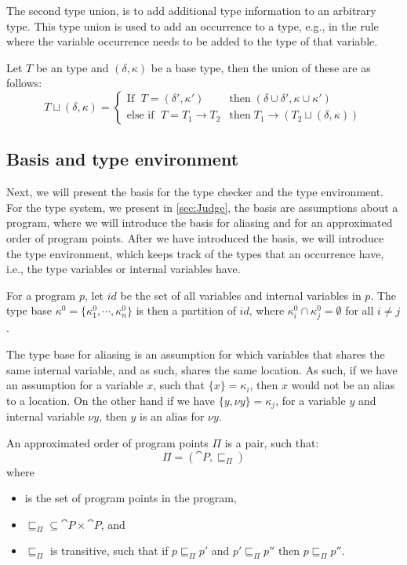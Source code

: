 \documentclass[../../master.tex]{subfiles}
\begin{document}
The second type union, is to add additional type information to an arbitrary type.
This type union is used to add an occurrence to a type, e.g., in the  rule where the variable occurrence needs to be added to the type of that variable.
\begin{definition}
	Let $T$ be an type and $(\delta,\kappa)$ be a base type, then the union of these are as follows:
	\begin{equation*}
		T\sqcup (\delta,\kappa)=
		\left\{\begin{matrix}
			\mbox{If } \; T=(\delta',\kappa')  & \mbox{then} \; (\delta\cup\delta',\kappa\cup\kappa')\\
			\mbox{else if } \; T=T_1\rightarrow T_2 & \mbox{then} \; T_1\rightarrow(T_2\sqcup (\delta,\kappa))
		\end{matrix}\right.
	\end{equation*}
\end{definition}

\subsection{Basis and type environment}
Next, we will present the basis for the type checker and the type environment.
For the type system, we present in \cref{sec:Judge}, the basis are assumptions about a program, where we will introduce the basis for aliasing and for an approximated order of program points.
After we have introduced the basis, we will introduce the type environment, which keeps track of the types that an occurrence have, i.e., the type variables or internal variables have.

\begin{definition}
	For a program $p$, let $id$ be the set of all variables and internal variables in $p$.
	The type base $\kappa^0=\{\kappa^0_1,\cdots,\kappa^0_n\}$ is then a partition of $id$, where $\kappa_i^0\cap\kappa_j^0=\emptyset$ for all $i\neq j$.
\end{definition}

The type base for aliasing is an assumption for which variables that shares the same internal variable, and as such, shares the same location.
As such, if we have an assumption for a variable $x$, such that $\{x\}=\kappa_i$, then $x$ would not be an alias to a location.
On the other hand if we have $\{y,\nu y\}=\kappa_j$, for a variable $y$ and internal variable $\nu y$, then $y$ is an alias for $\nu y$.

\begin{definition}
	An approximated order of program points $\Pi$ is a pair, such that: 
	$$\Pi=(\cat{P},\sqsubseteq_\Pi)$$
	where
	\begin{itemize}
		\item {} is the set of program points in the program,
		\item $\sqsubseteq_\Pi\subseteq\cat{P}\times\cat{P}$, and
		\item $\sqsubseteq_\Pi$ is transitive, such that if $p\sqsubseteq_\Pi p'$ and $p'\sqsubseteq_\Pi p''$ then $p\sqsubseteq_\Pi p''$.
	\end{itemize}
\end{definition}
\end{document}
